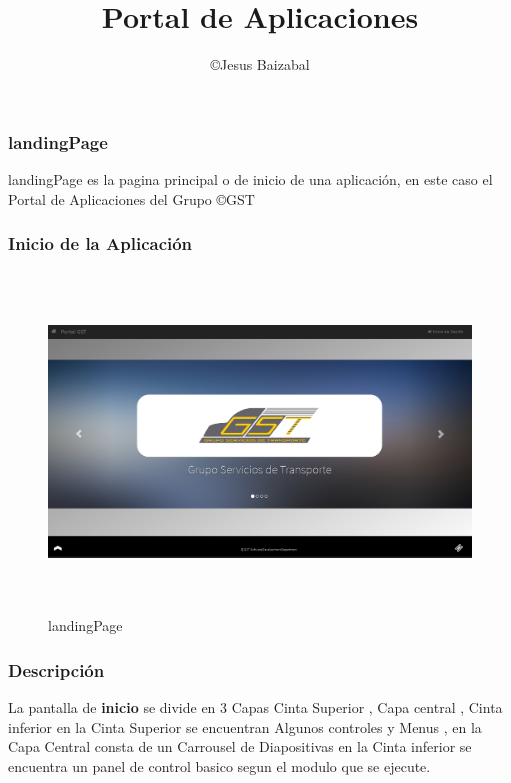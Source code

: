 \documentclass[12pt,letterpaper]{article}
\begin{document}
  {
	\sffamily %
	\title{Portal de Aplicaciones}
	\author{\copyright Jesus Baizabal}
	\maketitle
	\tableofcontents
	\newpage
  }

  \begin{section}{\color{kblue}}
  	\begin{subsection}{\color{blackgreen}}
  	\sffamily
  	{

    \subsubsection{landingPage}
      landingPage es la pagina principal o de inicio de una aplicaci\'on, en este caso el Portal de Aplicaciones del Grupo \copyright{GST}

    \subsubsection{Inicio de la Aplicaci\'on}
      \begin{figure}[htb]
        \centering
        \includegraphics[angle=0,width=140mm,height=90mm]{img/Selection_064.png}
        \caption{landingPage}
        \label{sel064}
      \end{figure}

\newpage
    \subsubsection{Descripci\'on}
      La pantalla de \textbf{inicio} se divide en 3 Capas  Cinta Superior , Capa central , Cinta inferior
      en la Cinta Superior se encuentran Algunos controles y Menus , en la Capa Central consta de un Carrousel de Diapositivas
      en la Cinta inferior se encuentra un panel de control basico segun el modulo que se ejecute.

}
\end{subsection}
\end{section}
\end{document}
